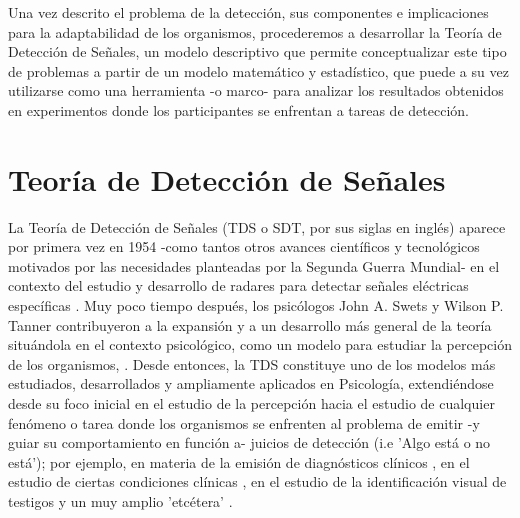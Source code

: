 Una vez descrito el problema de la detección, sus componentes e implicaciones para la adaptabilidad de los organismos, procederemos a desarrollar la Teoría de Detección de Señales, un modelo descriptivo que permite conceptualizar este tipo de problemas a partir de un modelo matemático y estadístico, que puede a su vez utilizarse como una herramienta -o marco- para analizar los resultados obtenidos en experimentos donde los participantes se enfrentan a tareas de detección.\\

\section{Teoría de Detección de Señales}

La Teoría de Detección de Señales (TDS o SDT, por sus siglas en inglés) aparece por primera vez en 1954 -como tantos otros avances científicos y tecnológicos motivados por las necesidades planteadas por la Segunda Guerra Mundial- en el contexto del estudio y desarrollo de radares para detectar señales eléctricas específicas \parencite{Peterson1954}. Muy poco tiempo después, los psicólogos John A. Swets y Wilson P. Tanner contribuyeron a la expansión y a un desarrollo más general de la teoría situándola en el contexto psicológico, como un modelo para estudiar la percepción de los organismos, \parencite{Tanner1954, Swets1961}. Desde entonces, la TDS constituye uno de los modelos más estudiados, desarrollados y ampliamente aplicados en Psicología, extendiéndose desde su foco inicial en el estudio de la percepción \parencite{Rosenholtz2001, Pessoa2005, Wallis2007} hacia el estudio de cualquier fenómeno o tarea donde los organismos se enfrenten al problema de emitir -y guiar su comportamiento en función a- juicios de detección (i.e 'Algo está o no está'); por ejemplo, en materia de la emisión de diagnósticos clínicos \parencite{Grossberg1978, Swets2000, Boutis2010}, en el estudio de ciertas condiciones clínicas \parencite{Westermann2010, Bonnel2003, Brown1994, Naliboff1981}, en el estudio de la identificación visual de testigos \parencite{Gronlund2014, Wixted2014, Wixted2016} y un muy amplio 'etcétera' \parencite{Gordon1974, Nuechterlein1983, Harvey1992, Verghese2001}.\\ 

